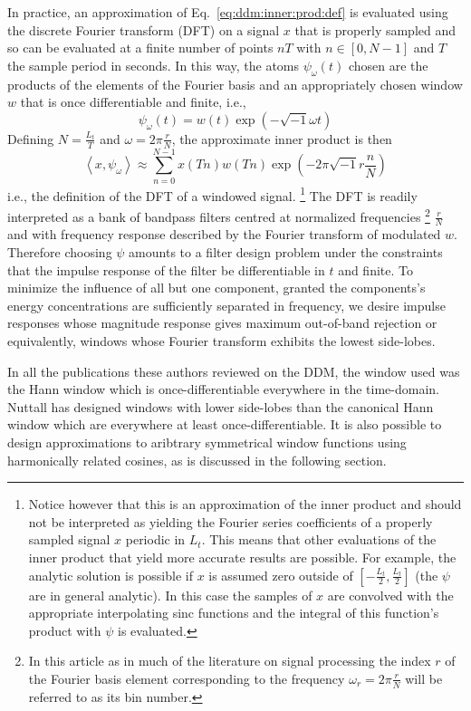 \documentclass[twoside,a4paper]{article}
\begin{document}
In practice, an approximation of Eq.~\ref{eq:ddm:inner:prod:def} is evaluated using
the discrete Fourier transform (DFT) on a signal $x$ that is properly sampled
and so can be evaluated at a finite number of points $nT$ with $n \in [0,N-1]$ and
$T$ the sample period in seconds. In this way, the atoms $\psi_{\omega}(t)$ chosen
are the products of the elements of the Fourier basis and an appropriately
chosen window $w$ that is once differentiable and finite, i.e.,
%
\[
    \psi_{\omega}(t) = w(t) \exp(-\sqrt{-1} \omega t)
\]
%
Defining $N = \frac{L_{t}}{T}$ and $\omega = 2
\pi \frac{r}{N}$, the approximate
inner product is then
%
\[
    \left\langle x , \psi_{\omega} \right\rangle \approx 
    \sum_{n=0}^{N-1} x(Tn) w(Tn) \exp(-2 \pi \sqrt{-1} r \frac{n}{N}) 
\]
%
i.e., the definition of the DFT of a windowed signal.%
\footnote{%
    Notice however that this is an approximation of the inner product and should
    not be interpreted as yielding the Fourier series coefficients of a properly
    sampled signal $x$ periodic in $L_{t}$. This means that other
    evaluations of the inner product that yield more accurate results are
    possible. For example, the analytic solution is possible if $x$ is assumed
    zero outside of $[-\frac{L_{t}}{2},\frac{L_{t}}{2}]$ (the $\psi$ are in
    general analytic).  In this case the samples of $x$ are convolved with the
    appropriate interpolating sinc functions and the integral of this function's
    product with $\psi$ is evaluated.
}%
The DFT is readily interpreted as a bank of bandpass filters centred at
normalized frequencies%
\footnote{%
In this article as in much of the literature on signal processing the index $r$
of the Fourier basis element corresponding to the frequency $\omega_{r} = 2 \pi
\frac{r}{N}$ will be referred to as its bin number.
}
$\frac{r}{N}$ and with frequency response described by
the Fourier transform of modulated $w$. Therefore choosing $\psi$ amounts to a
filter design problem under the constraints that the impulse response of the
filter be differentiable in $t$ and finite. To minimize the influence of
all but one component, granted the components's energy concentrations are
sufficiently separated in frequency, we desire impulse responses whose magnitude
response gives maximum
out-of-band rejection or equivalently, windows whose Fourier transform exhibits
the lowest side-lobes.

In all the publications these authors reviewed on the DDM, the window used was
the Hann window which is once-differentiable everywhere in the time-domain.
Nuttall has designed windows with lower side-lobes than the canonical Hann
window which are everywhere at least once-differentiable. It is also possible to
design approximations to aribtrary symmetrical window functions using
harmonically related cosines, as is discussed in the following section.
\end{document}
